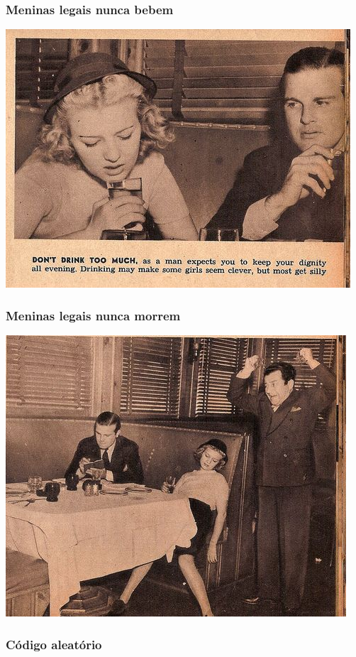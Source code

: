 \begin{frame}
	\frametitle{Meninas legais nunca bebem}

	\begin{center}
		\includegraphics[scale=0.4]{imagens/drink}
	\end{center}

\end{frame}

\begin{frame}
	\frametitle{Meninas legais nunca morrem}

	\begin{center}
		\includegraphics[scale=0.4]{imagens/drink2}
	\end{center}

\end{frame}

\begin{frame}[fragile]
	\frametitle{Código aleatório}

	
\end{frame}

